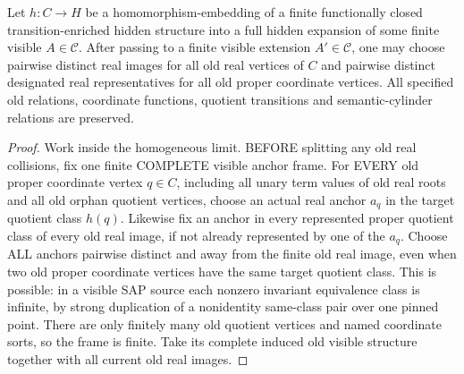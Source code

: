 \begin{lemma}
\label{lem:typed-real-sort-splitting}
Let \(h:C\to H\) be a homomorphism-embedding of a finite functionally closed
transition-enriched hidden structure into a full hidden expansion of some
finite visible \(A\in\mathcal C\).  After passing to a finite visible
extension \(A'\in\mathcal C\), one may choose pairwise distinct real images
for all old real vertices of \(C\) and pairwise distinct designated real
representatives for all old proper coordinate vertices.  All specified old
relations, coordinate functions, quotient transitions and semantic-cylinder
relations are preserved.
\end{lemma}

\begin{proof}
Work inside the homogeneous limit.
BEFORE splitting any old real collisions,
fix one finite COMPLETE visible anchor frame.
For EVERY old proper coordinate vertex
\(q\in C\), including all unary term
values of old real roots and all old
orphan quotient vertices, choose an
actual real anchor \(a_q\) in the
target quotient class \(h(q)\).
Likewise fix an anchor in every
represented proper quotient class
of every old real image, if not
already represented by one of the
\(a_q\). Choose ALL anchors pairwise distinct
and away from the finite old real
image, even when two old proper
coordinate vertices have the same
target quotient class.
This is possible: in a visible
SAP source each nonzero invariant
equivalence class is infinite,
by strong duplication of a
nonidentity same-class pair over
one pinned point. There are
only finitely many old quotient
vertices and named coordinate
sorts, so the frame is finite.
Take its complete induced old
visible structure together with
all current old real images.


\end{proof}
